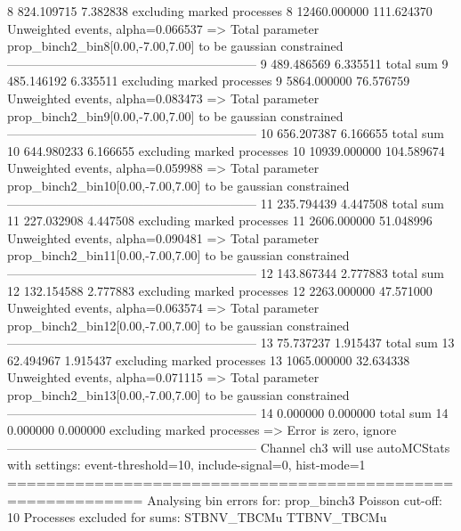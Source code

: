 8          824.109715      7.382838        excluding marked processes    
8          12460.000000    111.624370      Unweighted events, alpha=0.066537
  => Total parameter prop_binch2_bin8[0.00,-7.00,7.00] to be gaussian constrained
------------------------------------------------------------
9          489.486569      6.335511        total sum                     
9          485.146192      6.335511        excluding marked processes    
9          5864.000000     76.576759       Unweighted events, alpha=0.083473
  => Total parameter prop_binch2_bin9[0.00,-7.00,7.00] to be gaussian constrained
------------------------------------------------------------
10         656.207387      6.166655        total sum                     
10         644.980233      6.166655        excluding marked processes    
10         10939.000000    104.589674      Unweighted events, alpha=0.059988
  => Total parameter prop_binch2_bin10[0.00,-7.00,7.00] to be gaussian constrained
------------------------------------------------------------
11         235.794439      4.447508        total sum                     
11         227.032908      4.447508        excluding marked processes    
11         2606.000000     51.048996       Unweighted events, alpha=0.090481
  => Total parameter prop_binch2_bin11[0.00,-7.00,7.00] to be gaussian constrained
------------------------------------------------------------
12         143.867344      2.777883        total sum                     
12         132.154588      2.777883        excluding marked processes    
12         2263.000000     47.571000       Unweighted events, alpha=0.063574
  => Total parameter prop_binch2_bin12[0.00,-7.00,7.00] to be gaussian constrained
------------------------------------------------------------
13         75.737237       1.915437        total sum                     
13         62.494967       1.915437        excluding marked processes    
13         1065.000000     32.634338       Unweighted events, alpha=0.071115
  => Total parameter prop_binch2_bin13[0.00,-7.00,7.00] to be gaussian constrained
------------------------------------------------------------
14         0.000000        0.000000        total sum                     
14         0.000000        0.000000        excluding marked processes    
  => Error is zero, ignore      
------------------------------------------------------------
Channel ch3 will use autoMCStats with settings: event-threshold=10, include-signal=0, hist-mode=1
============================================================
Analysing bin errors for: prop_binch3
Poisson cut-off: 10
Processes excluded for sums: STBNV_TBCMu TTBNV_TBCMu
